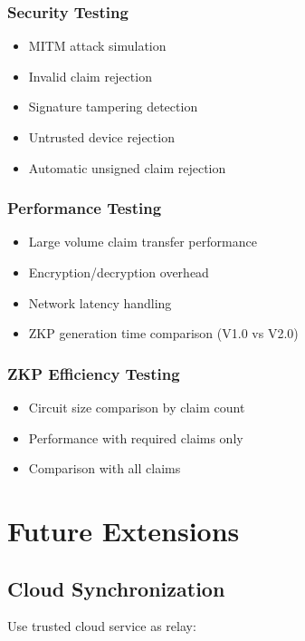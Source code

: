 \subsubsection{Security Testing}

\begin{itemize}
  \item MITM attack simulation
  \item Invalid claim rejection
  \item Signature tampering detection
  \item Untrusted device rejection
  \item Automatic unsigned claim rejection
\end{itemize}

\subsubsection{Performance Testing}

\begin{itemize}
  \item Large volume claim transfer performance
  \item Encryption/decryption overhead
  \item Network latency handling
  \item ZKP generation time comparison (V1.0 vs V2.0)
\end{itemize}

\subsubsection{ZKP Efficiency Testing}

\begin{itemize}
  \item Circuit size comparison by claim count
  \item Performance with required claims only
  \item Comparison with all claims
\end{itemize}

\section{Future Extensions}

\subsection{Cloud Synchronization}

Use trusted cloud service as relay:

